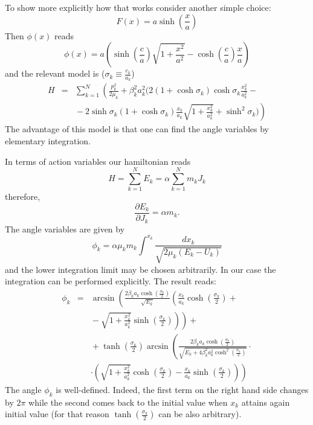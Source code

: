 \documentclass[a4paper,12pt]{article}
\begin{document}
To show more explicitly how that  works  consider another simple choice:
\begin{equation}
F(x)=a\sinh\left(\frac{x}{a}\right)
\label{w6}
\end{equation}
Then $\phi(x)$ reads
\begin{equation}
\phi(x)=a(\sinh\left(\frac{c}{a}\right)\sqrt{1+\frac{x^2}{a^2}}-\cosh\left(\frac{c}{a}\right)\frac{x}{a})
\label{w7}
\end{equation}
and the relevant model is ($\sigma_k\equiv\frac{c_k}{a_k}$)
\begin{eqnarray}
H&=&\sum_{k=1}^N\left(\frac{p_k^2}{2\mu_k}+\beta_k^2a^2_k(2(1+\cosh\sigma_k)\cosh\sigma_k
\frac{x_k^2}{a_k^2}-{}\right.\nonumber\\
&&\left.{}-2\sinh\sigma_k(1+\cosh\sigma_k)\frac{x_k}{a_k}\sqrt{1+\frac{x_k^2}{a_k^2}}
+\sinh^2\sigma_k)\right)
\label{w8}
\end{eqnarray}
The advantage of this model is that one can find the angle variables by elementary integration.

In terms of action variables our hamiltonian reads \cite{1}
\begin{equation}
H=\sum_{k=1}^NE_k=\alpha\sum_{k=1}^Nm_kJ_k
\label{w9}
\end{equation}
therefore,
\begin{equation}
\frac{\partial E_k}{\partial J_k}=\alpha m_k.
\label{w10}
\end{equation}
The angle variables are given by
\begin{equation}
\label{w11}
\phi_k=\alpha\mu_km_k\int^{x_k}\frac{\displaystyle dx_k}{\displaystyle \sqrt{2\mu_k(E_k-U_k)}}
\end{equation}
and the lower integration limit may be chosen arbitrarily. In our case the integration can be performed 
explicitly. The result reads:
\begin{eqnarray}
\phi_k&=&\arcsin\left(\frac{\displaystyle 2\beta_ka_k\cosh\left(\frac{\sigma_k}{2}\right)}
{\displaystyle \sqrt{E_k}}\left(\frac{x_k}{a_k}\cosh\left(\frac{\sigma_k}{2}\right)+{}\right.\right.
\nonumber\\
&&\left.\left.{}-\sqrt{1+\frac{x^2_k}{a^2_k}}\sinh\left(\frac{\sigma_k}{2}\right)\right)\right)
+{}\nonumber\\
&&{}+\tanh\left(\frac{\sigma_k}{2}\right)\arcsin\left(
\frac{\displaystyle 2\beta_ka_k\cosh\left(\frac{\sigma_k}{2}\right)}{\displaystyle
\sqrt{E_k+4\beta_k^2a_k^2\cosh^2\left(\frac{\sigma_k}{2}\right)}}\cdot{}\right.\nonumber\\
&&\cdot\left.\left(\sqrt{1+\frac{x^2_k}{a^2_k}}\cosh\left(\frac{\sigma_k}{2}\right)
-\frac{x_k}{a_k}\sinh\left(\frac{\sigma_k}{2}\right)\right)\right)
\label{w12}
\end{eqnarray}
The angle $\phi_k$ is well-defined. Indeed, the first term on the right hand side changes by $2\pi$ 
while the second comes  back to the initial value when $x_k$ attains again initial value
(for that reason $\tanh\left(\frac{\sigma_k}{2}\right)$ can be also arbitrary).
\end{document}

